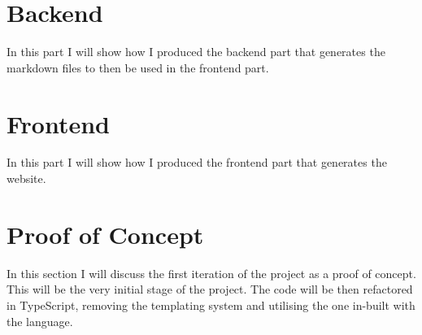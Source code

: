 \section{Backend}
\label{s:Backend}
In this part I will show how I produced the backend part that generates the markdown files to then be used in the frontend part.

\section{Frontend}
\label{s:Frontend}
In this part I will show how I produced the frontend part that generates the website.

\section{Proof of Concept}
\label{s:Proof of Concept}
In this section I will discuss the first iteration of the project as a proof of concept. This will be the very initial stage of the project.
The code will be then refactored in TypeScript, removing the templating system and utilising the one in-built with the language.
